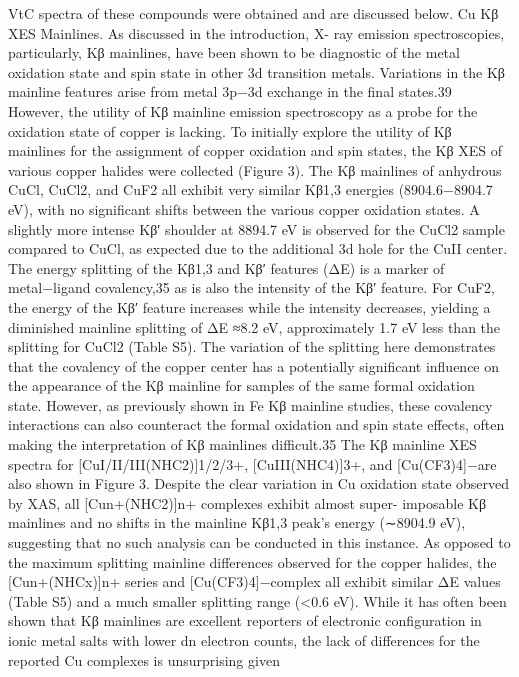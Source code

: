 \documentclass{article}
\begin{document}
VtC spectra of these compounds were obtained and are
discussed below.
Cu Kβ XES Mainlines. As discussed in the introduction, X-
ray emission spectroscopies, particularly, Kβ mainlines, have
been shown to be diagnostic of the metal oxidation state and
spin state in other 3d transition metals. Variations in the Kβ
mainline features arise from metal 3p−3d exchange in the ﬁnal
states.39 However, the utility of Kβ mainline emission
spectroscopy as a probe for the oxidation state of copper is
lacking. To initially explore the utility of Kβ mainlines for the
assignment of copper oxidation and spin states, the Kβ XES of
various copper halides were collected (Figure 3). The Kβ
mainlines of anhydrous CuCl, CuCl2, and CuF2 all exhibit very
similar Kβ1,3 energies (8904.6−8904.7 eV), with no signiﬁcant
shifts between the various copper oxidation states. A slightly
more intense Kβ′ shoulder at 8894.7 eV is observed for the
CuCl2 sample compared to CuCl, as expected due to the
additional 3d hole for the CuII center. The energy splitting of
the Kβ1,3 and Kβ′ features (ΔE) is a marker of metal−ligand
covalency,35 as is also the intensity of the Kβ′ feature. For
CuF2, the energy of the Kβ′ feature increases while the
intensity decreases, yielding a diminished mainline splitting of
ΔE ≈8.2 eV, approximately 1.7 eV less than the splitting for
CuCl2 (Table S5). The variation of the splitting here
demonstrates that the covalency of the copper center has a
potentially signiﬁcant inﬂuence on the appearance of the Kβ
mainline for samples of the same formal oxidation state.
However, as previously shown in Fe Kβ mainline studies, these
covalency interactions can also counteract the formal oxidation
and spin state eﬀects, often making the interpretation of Kβ
mainlines diﬃcult.35
The Kβ mainline XES spectra for [CuI/II/III(NHC2)]1/2/3+,
[CuIII(NHC4)]3+, and [Cu(CF3)4]−are also shown in Figure
3. Despite the clear variation in Cu oxidation state observed by
XAS, all [Cun+(NHC2)]n+ complexes exhibit almost super-
imposable Kβ mainlines and no shifts in the mainline Kβ1,3
peak’s energy (∼8904.9 eV), suggesting that no such analysis
can be conducted in this instance. As opposed to the maximum
splitting mainline diﬀerences observed for the copper halides,
the [Cun+(NHCx)]n+ series and [Cu(CF3)4]−complex all
exhibit similar ΔE values (Table S5) and a much smaller
splitting range (<0.6 eV). While it has often been shown that
Kβ mainlines are excellent reporters of electronic conﬁguration
in ionic metal salts with lower dn electron counts, the lack of
diﬀerences for the reported Cu complexes is unsurprising given
\end{document}
